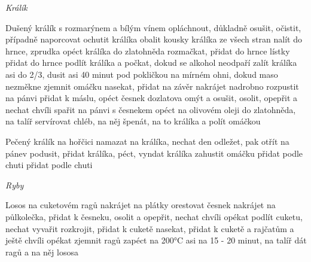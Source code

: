 \documentclass[12pt,a4paper]{article}
\begin{document}
\vspace*{\fill}
\hfill {\Huge\it Králík}\hfill
\vspace*{\fill}
\newpage

\begin{recipe}{Dušený králík s rozmarýnem a bílým vínem}
   opláchnout, důkladně osušit, očistit, případně naporcovat
   ochutit králíka
   obalit kousky králíka ze všech stran
   nalít do hrnce, zprudka opéct králíka do zlatohněda
   rozmačkat, přidat do hrnce
   lístky přidat do hrnce
   podlít králíka a počkat, dokud se alkohol neodpaří
   zalít králíka asi do 2/3, dusit asi 40 minut pod pokličkou na mírném ohni, dokud maso nezměkne
   zjemnit omáčku
   nasekat, přidat na závěr
   nakrájet nadrobno
   rozpustit na pánvi
   přidat k máslu, opéct česnek dozlatova
   omýt a osušit, osolit, opepřit a nechat chvíli spařit na pánvi s česnekem
   opéct na olivovém oleji do zlatohněda, na talíř servírovat chléb, na něj špenát, na to králíka a polít omáčkou
\end{recipe}
\newpage

\begin{recipe}{Pečený králík na hořčici}
   namazat na králíka, nechat den odležet, pak otřít
   na pánev
   podusit, přidat králíka, péct, vyndat králíka
   zahustit omáčku
   přidat podle chuti
   přidat podle chuti
\end{recipe}
\newpage

\vspace*{\fill}
\hfill {\Huge\it Ryby}\hfill
\vspace*{\fill}
\newpage

\begin{recipe}{Losos na cuketovém ragů}
   nakrájet na plátky
   orestovat česnek
   nakrájet na půlkolečka, přidat k česneku, osolit a opepřit, nechat chvíli opékat
   podlít cuketu, nechat vyvařit
   rozkrojit, přidat k cuketě
   nasekat, přidat k cuketě a rajčatům a ještě chvíli opékat
   zjemnit ragů
   zapéct na 200°C asi na 15 - 20 minut, na talíř dát ragů a na něj lososa
\end{recipe}
\newpage
\end{document}
